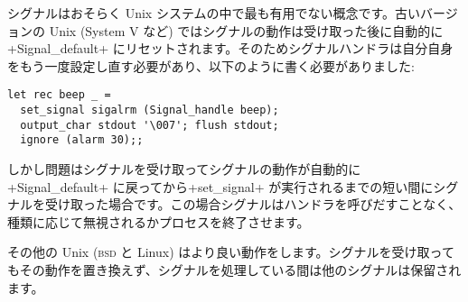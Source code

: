 シグナルはおそらく Unix システムの中で最も有用でない概念です。古いバージョンの Unix (System V など) ではシグナルの動作は受け取った後に自動的に\ml+Signal_default+ にリセットされます。そのためシグナルハンドラは自分自身をもう一度設定し直す必要があり、以下のように書く必要がありました:
%
\begin{lstlisting}
let rec beep _ =
  set_signal sigalrm (Signal_handle beep);
  output_char stdout '\007'; flush stdout;
  ignore (alarm 30);;
\end{lstlisting}
%
しかし問題はシグナルを受け取ってシグナルの動作が自動的に \ml+Signal_default+ に戻ってから\ml+set_signal+ が実行されるまでの短い間にシグナルを受け取った場合です。この場合シグナルはハンドラを呼びだすことなく、種類に応じて無視されるかプロセスを終了させます。

その他の Unix (\textsc{bsd} と Linux) はより良い動作をします。シグナルを受け取ってもその動作を置き換えず、シグナルを処理している間は他のシグナルは保留されます。
